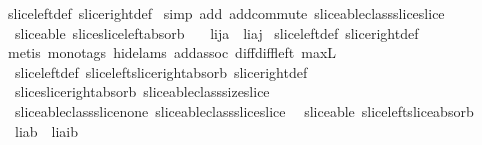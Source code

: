 \begin{isabellebody}
%
\isatagproof
{}\isamarkupfalse%
\ slice{\isacharunderscore}left{\isacharunderscore}def\ slice{\isacharunderscore}right{\isacharunderscore}def\isanewline
{}\isamarkupfalse%
\ {\isacharparenleft}simp\ add{\isacharcolon}\ add{\isachardot}commute\ sliceable{\isacharunderscore}class{\isachardot}slice{\isacharunderscore}slice{\isacharparenright}%
\endisatagproof
{\isafoldproof}%
%
\isadelimproof
\isanewline
%
\endisadelimproof
\isanewline
{}\isamarkupfalse%
\ {\isacharparenleft}\ sliceable{\isacharparenright}\ slice{\isacharunderscore}slice{\isacharunderscore}left{\isacharunderscore}absorb{\isacharcolon}\ \isanewline
\ \ {\isachardoublequoteopen}{\isacharparenleft}l{\isasymdagger}i{\isachardot}{\isachardot}j{\isacharparenright}{\isasymdagger}a{\isachardot}{\isachardot}\ {\isacharequal}\ l{\isasymdagger}{\isacharparenleft}i{\isacharplus}a{\isacharparenright}{\isachardot}{\isachardot}j{\isachardoublequoteclose}\isanewline
%
\isadelimproof
%
\endisadelimproof
%
\isatagproof
{}\isamarkupfalse%
\ slice{\isacharunderscore}left{\isacharunderscore}def\ slice{\isacharunderscore}right{\isacharunderscore}def\isanewline
{}\isamarkupfalse%
\ {\isacharparenleft}metis\ {\isacharparenleft}mono{\isacharunderscore}tags{\isacharcomma}\ hide{\isacharunderscore}lams{\isacharparenright}\ add{\isachardot}assoc\ diff{\isacharunderscore}diff{\isacharunderscore}left\ max{\isacharunderscore}{}L\ \isanewline
\ \ slice{\isacharunderscore}left{\isacharunderscore}def\ slice{\isacharunderscore}left{\isacharunderscore}slice{\isacharunderscore}right{\isacharunderscore}absorb\ slice{\isacharunderscore}right{\isacharunderscore}def\ \isanewline
\ \ slice{\isacharunderscore}slice{\isacharunderscore}right{\isacharunderscore}absorb\ sliceable{\isacharunderscore}class{\isachardot}size{\isacharunderscore}slice\ \isanewline
\ \ sliceable{\isacharunderscore}class{\isachardot}slice{\isacharunderscore}none\ sliceable{\isacharunderscore}class{\isachardot}slice{\isacharunderscore}slice{\isacharparenright}%
\endisatagproof
{\isafoldproof}%
%
\isadelimproof
\isanewline
%
\endisadelimproof
\isanewline
{}\isamarkupfalse%
\ {\isacharparenleft}\ sliceable{\isacharparenright}\ slice{\isacharunderscore}left{\isacharunderscore}slice{\isacharunderscore}absorb{\isacharcolon}\ \isanewline
\ \ {\isachardoublequoteopen}{\isacharparenleft}l{\isasymdagger}i{\isachardot}{\isachardot}{\isacharparenright}{\isasymdagger}a{\isachardot}{\isachardot}b\ {\isacharequal}\ l{\isasymdagger}{\isacharparenleft}i{\isacharplus}a{\isacharparenright}{\isachardot}{\isachardot}{\isacharparenleft}i{\isacharplus}b{\isacharparenright}{\isachardoublequoteclose}\isanewline

\end{isabellebody}
